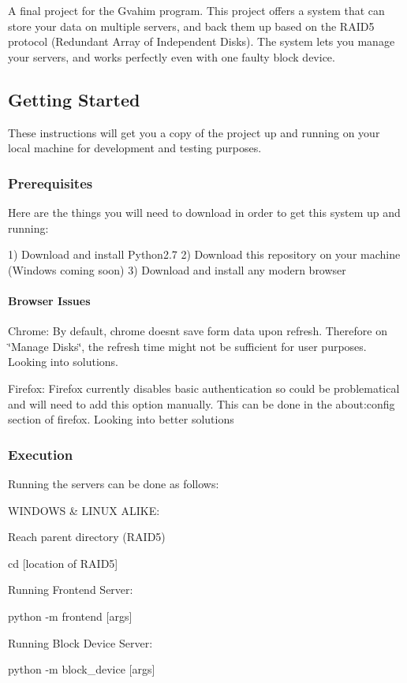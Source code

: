 A final project for the Gvahim program. This project offers a system that can store your data on multiple servers, and back them up based on the R\+A\+I\+D5 protocol (Redundant Array of Independent Disks). The system lets you manage your servers, and works perfectly even with one faulty block device.

\subsection*{Getting Started}

These instructions will get you a copy of the project up and running on your local machine for development and testing purposes.

\subsubsection*{Prerequisites}

Here are the things you will need to download in order to get this system up and running\+:


\begin{DoxyCode}
1) Download and install Python2.7
2) Download this repository on your machine (Windows coming soon)
3) Download and install any modern browser
\end{DoxyCode}


\paragraph*{Browser Issues}

Chrome\+: By default, chrome doesn\textquotesingle{}t save form data upon refresh. Therefore on \char`\"{}\+Manage Disks\char`\"{}, the refresh time might not be sufficient for user purposes. Looking into solutions.

Firefox\+: Firefox currently disables basic authentication so could be problematical and will need to add this option manually. This can be done in the about\+:config section of firefox. Looking into better solutions

\subsubsection*{Execution}

Running the servers can be done as follows\+:

W\+I\+N\+D\+O\+WS \& L\+I\+N\+UX A\+L\+I\+KE\+:

Reach parent directory (R\+A\+I\+D5) 
\begin{DoxyCode}
cd [location of RAID5]
\end{DoxyCode}
 Running Frontend Server\+: 
\begin{DoxyCode}
python -m frontend [args]
\end{DoxyCode}
 Running Block Device Server\+: 
\begin{DoxyCode}
python -m block\_device [args]
\end{DoxyCode}


